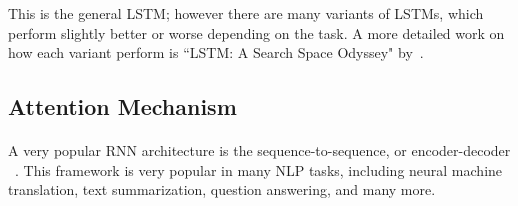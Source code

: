 
This is the general LSTM; however there are many variants of LSTMs, which perform slightly better or worse depending on the task. A more detailed work on how each variant perform is ``LSTM: A Search Space Odyssey" by~\citet{greff2017lstm}.


\subsection{Attention Mechanism}
\label{sec:encoder_decoder}


\paragraph{}
A very popular RNN architecture is the sequence-to-sequence, or encoder-decoder ~\citep{cho-etal-2014-learning,sutskever2014sequence}. This framework is very popular in many NLP tasks, including neural machine translation, text summarization, question answering, and many more. 

